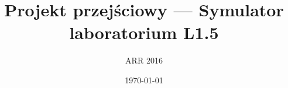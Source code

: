 \documentclass[12pt,a4paper,twoside,openright,fleqn]{mwrep}
\title{Projekt przejściowy --- Symulator laboratorium L1.5}
\author{ARR 2016}
\date{\today}
\begin{document}
\VerbatimFootnotes

\tableofcontents






\appendix



\nocite{*}

\end{document}
